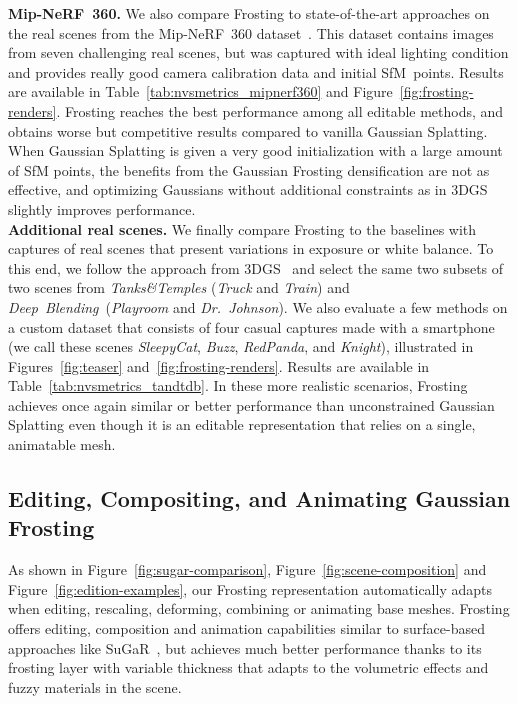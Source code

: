 \noindent
\textbf{Mip-NeRF~360.} We also compare Frosting to state-of-the-art approaches on the real scenes from the Mip-NeRF~360 dataset~\cite{barron2022mipnerf360}. This dataset contains images from seven challenging real scenes, but was captured with ideal lighting condition and provides really good camera calibration data and initial SfM~points. Results are available in Table~\ref{tab:nvsmetrics_mipnerf360} and Figure~\ref{fig:frosting-renders}. Frosting reaches the best performance among all editable methods, and obtains worse but competitive results compared to vanilla Gaussian Splatting. When Gaussian Splatting is given a very good initialization with a large amount of SfM points, the benefits from the Gaussian Frosting densification are not as effective, and optimizing Gaussians without additional constraints as in 3DGS slightly improves performance.\\

\noindent
\textbf{Additional real scenes.} We finally compare Frosting to the baselines with captures of real scenes that present variations in exposure or white balance. To this end, we follow the approach from 3DGS~\cite{kerbl3Dgaussians} and select the same two subsets of two scenes from \emph{Tanks\&Temples} (\emph{Truck} and \emph{Train}) and \emph{Deep~Blending}~(\emph{Playroom} and \emph{Dr.~Johnson}). We also evaluate a few methods on a custom dataset that consists of four casual captures made with a smartphone (we call these scenes \emph{SleepyCat}, \emph{Buzz}, \emph{RedPanda}, and \emph{Knight}), illustrated in Figures~\ref{fig:teaser} and~\ref{fig:frosting-renders}. Results are available in Table~\ref{tab:nvsmetrics_tandtdb}. In these more realistic scenarios, Frosting achieves once again similar or better performance than unconstrained Gaussian Splatting even though it is an editable representation that relies on a single, animatable mesh.




\subsection{Editing, Compositing, and Animating Gaussian Frosting}



As shown in Figure~\ref{fig:sugar-comparison}, Figure~\ref{fig:scene-composition} and Figure~\ref{fig:edition-examples}, our Frosting representation automatically adapts when editing, rescaling, deforming, combining or animating base meshes.
Frosting offers editing, composition and animation capabilities similar to surface-based approaches like SuGaR~\cite{guedon2023sugar}, but achieves much better performance thanks to its frosting layer with variable thickness that adapts to the volumetric effects and fuzzy materials in the scene.


